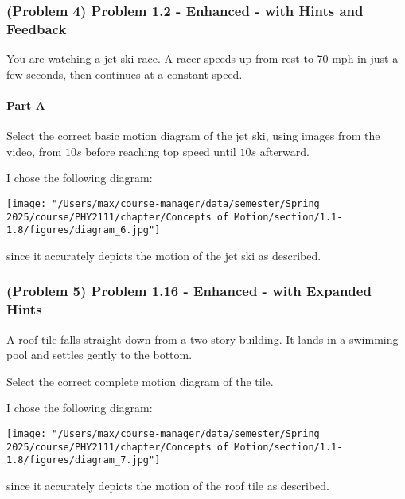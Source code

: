 \newpage

\subsubsection{(Problem 4) Problem 1.2 - Enhanced - with Hints and Feedback}

You are watching a jet ski race. A racer speeds up from rest to 70 mph in just a few seconds, then continues at a constant speed.

\paragraph{Part A}
Select the correct basic motion diagram of the jet ski, using images from the video, from $10s$ before reaching top speed until $10s$ afterward.

\vspace{1em}

\begin{solution}

	I chose the following diagram:

	\begin{center}
		\texttt{[image: "/Users/max/course-manager/data/semester/Spring 2025/course/PHY2111/chapter/Concepts of Motion/section/1.1-1.8/figures/diagram\_6.jpg"]}
	\end{center}

	since it accurately depicts the motion of the jet ski as described.

\end{solution}

\newpage

\subsubsection{(Problem 5) Problem 1.16 - Enhanced - with Expanded Hints}

A roof tile falls straight down from a two-story building. It lands in a swimming pool and settles gently to the bottom.

Select the correct complete motion diagram of the tile.

\vspace{1em}

\begin{solution}

	I chose the following diagram:

	\begin{center}
		\texttt{[image: "/Users/max/course-manager/data/semester/Spring 2025/course/PHY2111/chapter/Concepts of Motion/section/1.1-1.8/figures/diagram\_7.jpg"]}
	\end{center}

	since it accurately depicts the motion of the roof tile as described.
\end{solution}

